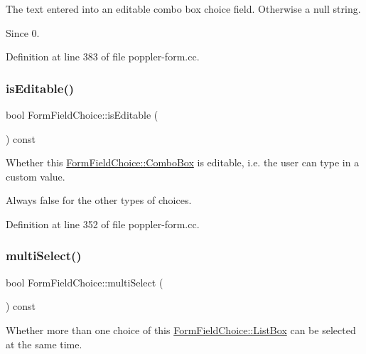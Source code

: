 The text entered into an editable combo box choice field. Otherwise a null string.

\begin{DoxySince}{Since}
0. 
\end{DoxySince}


Definition at line 383 of file poppler-\/form.\+cc.

\mbox{\label{class_poppler_1_1_form_field_choice_ad51544ab1ee11a87a373b6d16a0ed21d}} 
\subsubsection{\texorpdfstring{is\+Editable()}{isEditable()}}
{\footnotesize\ttfamily bool Form\+Field\+Choice\+::is\+Editable (\begin{DoxyParamCaption}{ }\end{DoxyParamCaption}) const}

Whether this \hyperlink{class_poppler_1_1_form_field_choice_a28f7cab7585f5630e26d1b5ed832c050aaef28d49edcd0f5adb7eed2aec7e325f}{Form\+Field\+Choice\+::\+Combo\+Box} is editable, i.\+e. the user can type in a custom value.

Always false for the other types of choices. 

Definition at line 352 of file poppler-\/form.\+cc.

\mbox{\label{class_poppler_1_1_form_field_choice_aa1ec1424a98d884c2af404174e6014ae}} 
\subsubsection{\texorpdfstring{multi\+Select()}{multiSelect()}}
{\footnotesize\ttfamily bool Form\+Field\+Choice\+::multi\+Select (\begin{DoxyParamCaption}{ }\end{DoxyParamCaption}) const}

Whether more than one choice of this \hyperlink{class_poppler_1_1_form_field_choice_a28f7cab7585f5630e26d1b5ed832c050a64881020d6e7432fd711fdb12dbf228c}{Form\+Field\+Choice\+::\+List\+Box} can be selected at the same time.


